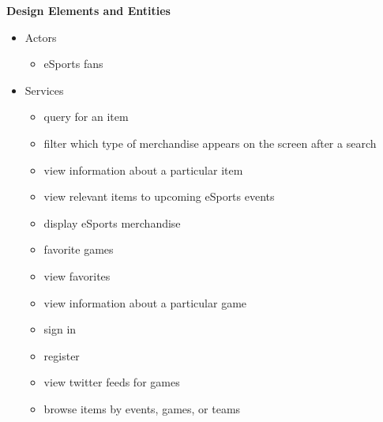 \documentclass[onecolumn, draftclsnofoot,10pt, compsoc]{IEEEtran}
\begin{document}
      \textbf{Design Elements and Entities}
     \begin{itemize}
     \item Actors
       \begin{itemize}
       \item eSports fans 
        \end{itemize}
       
     \item Services
      \begin{itemize}
      \item query for an item
      \item filter which type of merchandise appears on the screen after a search 
      \item view information about a particular item 
      \item view relevant items to upcoming eSports events
      \item display eSports merchandise
      \item favorite games
      \item view favorites
      \item view information about a particular game 
      \item sign in
      \item register 
      \item view twitter feeds for games
      \item browse items by events, games, or teams
       \end{itemize}
       \end{itemize}
       
\end{document}
